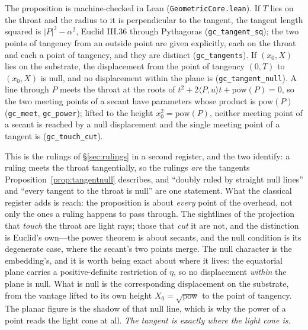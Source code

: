 \documentclass[11pt,a4paper]{article}
\theoremstyle{definition}
\begin{document}
\noindent The proposition is machine-checked in Lean (\texttt{GeometricCore.lean}). If $T$ lies on the throat and the radius to it is perpendicular to the tangent, the tangent length squared is $|P|^{2}-\alpha^{2}$, Euclid III.36 through Pythagoras (\texttt{gc\_tangent\_sq}); the two points of tangency from an outside point are given explicitly, each on the throat and each a point of tangency, and they are distinct (\texttt{gc\_tangents}). If $(x_0,X)$ lies on the substrate, the displacement from the point of tangency $(0,T)$ to $(x_0,X)$ is null, and no displacement within the plane is (\texttt{gc\_tangent\_null}). A line through $P$ meets the throat at the roots of $t^{2}+2\langle P,u\rangle t+\mathrm{pow}(P)=0$, so the two meeting points of a secant have parameters whose product is $\mathrm{pow}(P)$ (\texttt{gc\_meet}, \texttt{gc\_power}); lifted to the height $x_0^{2}=\mathrm{pow}(P)$, neither meeting point of a secant is reached by a null displacement and the single meeting point of a tangent is (\texttt{gc\_touch\_cut}).

This is the rulings of \S\ref{sec:rulings} in a second register, and the two
identify: a ruling meets the throat tangentially, so the rulings \emph{are} the
tangents Proposition~\ref{prop:tangentnull} describes, and ``doubly ruled by
straight null lines'' and ``every tangent to the throat is null'' are one
statement. What the classical register adds is reach: the proposition is about
\emph{every} point of the overhead, not only the ones a ruling happens to pass
through. The sightlines of the projection that \emph{touch} the throat are light
rays; those that \emph{cut} it are not, and the distinction is Euclid's own---the
power theorem is about secants, and the null condition is its degenerate case,
where the secant's two points merge. The null character is the embedding's, and
it is worth being exact about where it lives: the equatorial plane carries a
positive-definite restriction of $\eta$, so no displacement \emph{within} the
plane is null. What is null is the corresponding displacement on the substrate,
from the vantage lifted to its own height $X_{0}=\sqrt{\mathrm{pow}}$ to the
point of tangency. The planar figure is the
shadow of that null line, which is why the power of a point reads the light cone
at all. \emph{The tangent is exactly where the
light cone is.}
\end{document}
